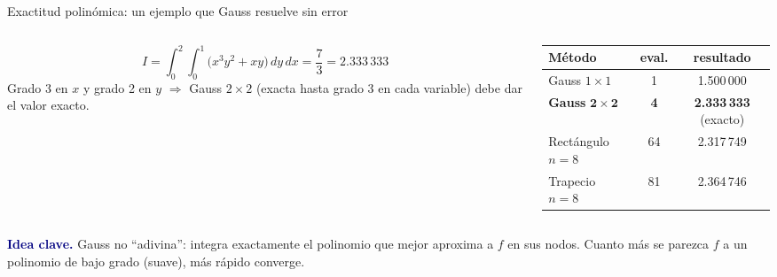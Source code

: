 \documentclass[aspectratio=169,10pt]{beamer}
\newcommand{\ideaclave}[1]{\begin{clave}\small\textbf{\textcolor{navy}{Idea clave.}} #1\end{clave}}
\begin{document}
\begin{frame}{Exactitud polin\'omica: un ejemplo que Gauss resuelve sin error}
\begin{columns}[T]
\begin{column}{0.48\textwidth}
\small
\[
I=\int_0^2\!\!\int_0^1\big(x^3y^2+xy\big)\,dy\,dx=\frac73=2.333\,333
\]
Grado 3 en $x$ y grado 2 en $y$ $\Rightarrow$ Gauss $2\times2$ (exacta hasta grado 3 en cada variable) debe dar el valor exacto.
\end{column}
\begin{column}{0.48\textwidth}
\centering\small
\begin{tabular}{@{}lcc@{}}
\toprule
M\'etodo & eval. & resultado\\
\midrule
Gauss $1\times1$ & 1 & 1.500\,000\\
\textbf{Gauss} $\mathbf{2\times2}$ & \textbf{4} & \textbf{2.333\,333} (exacto)\\
\midrule
Rect\'angulo $n=8$ & 64 & 2.317\,749\\
Trapecio $n=8$ & 81 & 2.364\,746\\
\bottomrule
\end{tabular}
\end{column}
\end{columns}
\ideaclave{Gauss no ``adivina'': integra exactamente el polinomio que mejor aproxima a $f$ en sus nodos. Cuanto m\'as se parezca $f$ a un polinomio de bajo grado (suave), m\'as r\'apido converge.}
\end{frame}
\end{document}

